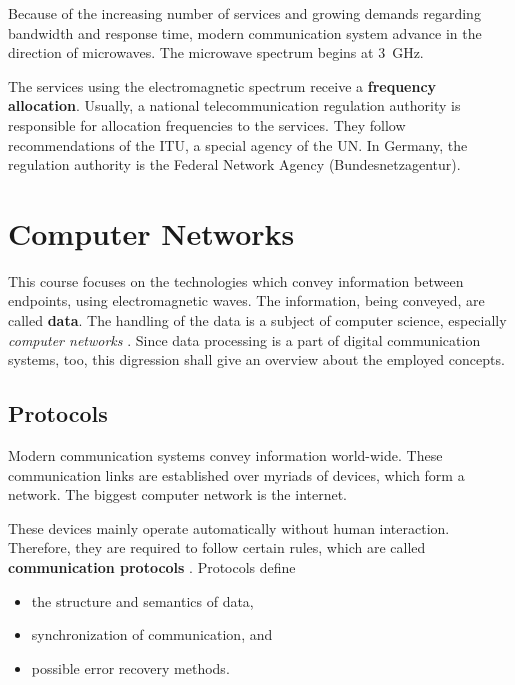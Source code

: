 \begin{refsection}
Because of the increasing number of services and growing demands regarding bandwidth and response time, modern communication system advance in the direction of microwaves. The microwave spectrum begins at \SI{3}{GHz}.


The services using the electromagnetic spectrum receive a  \textbf{frequency allocation}. Usually, a national telecommunication regulation authority is responsible for allocation frequencies to the services. They follow recommendations of the \ac{ITU}, a special agency of the \ac{UN}. In Germany, the regulation authority is the Federal Network Agency (Bundesnetzagentur).

\section{Computer Networks}


This course focuses on the technologies which convey information between endpoints, using electromagnetic waves. The information, being conveyed, are called \textbf{data}. The handling of the data is a subject of computer science, especially \emph{computer networks} . Since data processing is a part of digital communication systems, too, this digression shall give an overview about the employed concepts.


\subsection{Protocols}

Modern communication systems convey information world-wide. These communication links are established over myriads of devices, which form a network. The biggest computer network is the internet.

These devices mainly operate automatically without human interaction. Therefore, they are required to follow certain rules, which are called \textbf{communication protocols} . Protocols define
\begin{itemize}
	\item the structure and semantics of data,
	\item synchronization of communication, and
	\item possible error recovery methods.
\end{itemize}


\end{refsection}
